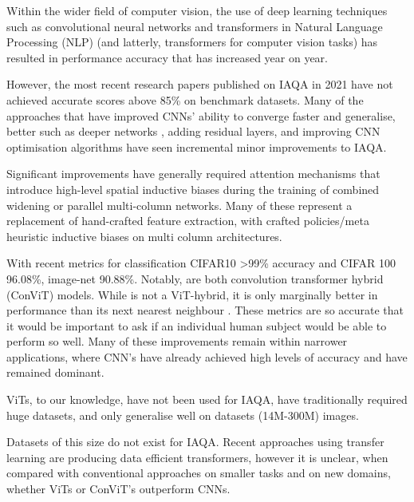 Within the wider field of computer vision, the use of deep learning techniques such as convolutional neural networks and transformers in Natural Language Processing (NLP) (and latterly, transformers for computer vision tasks) has resulted in performance accuracy that has increased year on year\cite{Sermanet2014,Simonyan2015a,Szegedy2015, He2016}. 

However, the most recent research papers published on IAQA in 2021 have not achieved accurate scores above 85\% on benchmark datasets. Many of the approaches that have improved CNNs' ability to converge faster and generalise, better such as deeper networks \cite{Simonyan2015a}, adding residual layers\cite{Krizhevsky2017a}, and improving CNN optimisation algorithms\cite{Kingma2015} have seen incremental minor improvements to IAQA.

\par
Significant improvements have generally required attention mechanisms that introduce high-level spatial inductive biases during the training of combined widening or parallel multi-column networks. Many of these represent a replacement of hand-crafted feature extraction, with crafted policies/meta heuristic inductive biases on multi column architectures. 
\par
 With recent metrics for classification CIFAR10\cite{Dosovitskiy2020} >99\% accuracy and CIFAR 100\cite{Foret2020}  96.08\%, image-net 90.88\%\cite{Dai2021}. Notably, \cite{Dai2021,Dosovitskiy2020} are both convolution transformer hybrid (ConViT) models. While \cite{Foret2020} is not a ViT-hybrid, it is only marginally better in performance than its next nearest neighbour \cite{Dosovitskiy2020}. These metrics are so accurate that it would be important to ask if an individual human subject would be able to perform so well. Many of these improvements remain within narrower applications, where CNN's have already achieved high levels of accuracy and have remained dominant\cite{Krizhevsky2017a,LeCun1998,He2016a}. 

ViTs, to our knowledge, have not been used for IAQA, have traditionally required huge datasets\cite{DAscoli2021, Touvron2020a, Khan2021}, and only generalise well on datasets (14M-300M) images\cite{Dosovitskiy2020}.

\par Datasets of this size do not exist for IAQA. Recent approaches using transfer learning are producing data efficient transformers\cite{DAscoli2021}, however it is unclear, when compared with conventional approaches on smaller tasks and on new domains, whether ViTs or ConViT's outperform CNNs. 

